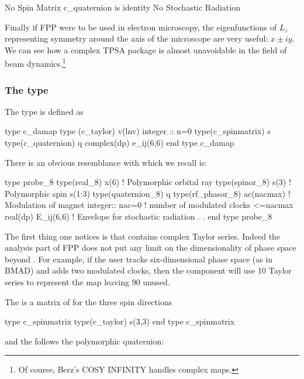 \documentclass[english,12pt,article]{article} %
\begin{document}
{\begin{example}
  No Spin Matrix
  c_quaternion is identity
 No Stochastic Radiation
\end{example}

Finally if FPP were to be used in electron microscopy, the eigenfunctions of $L_z$ representing symmetry around the axis of the microscope are very useful: $x \pm i y$. We can see how a complex TPSA package is almost unavoidable in the field of beam dynamics.\footnote{Of course, Berz's COSY INFINITY handles complex maps.}
 
\subsubsection{The type {} }\label{sec:c_damap}
  
  The type   is defined as
  \begin{example}
 type c_damap
   type (c_taylor) v(lnv)  
   integer :: n=0 
   type(c_spinmatrix) s 
   type(c_quaternion) q
   complex(dp) e_ij(6,6) 
 end type c_damap
  \end{example}


 
There is an obvious resemblance  with  which we recall is:
  \begin{example}
    type probe_8
     type(real_8) x(6)     ! Polymorphic orbital ray
     type(spinor_8) s(3)   ! Polymorphic spin s(1:3)
     type(quaternion_8) q 
     type(rf_phasor_8)  ac(nacmax)  ! Modulation of magnet
     integer:: nac=0 !  number of modulated clocks <=nacmax
     real(dp) E_ij(6,6)   !  Envelope for stochastic radiation
           .
           .
  end type probe_8
    \end{example}

The first thing one notices is that   contains  complex Taylor series. Indeed the analysis part of FPP does not put any limit on the dimensionality of phase space beyond . For example, if the user tracks six-dimensional phase space (as in BMAD) and adds two modulated clocks, then the component    will use 10 Taylor series to represent the map leaving 90 unused. 


The  is a matrix of   for the three spin directions
  \begin{example}
  type c_spinmatrix
     type(c_taylor) s(3,3)
  end type c_spinmatrix
      \end{example}
and the  follows the polymorphic quaternion:

}
\end{document}
